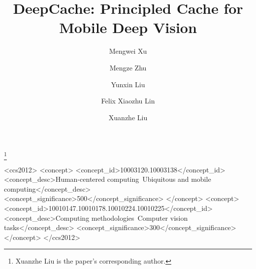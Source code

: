 \documentclass[10pt,acmtog]{acmart}
\newcommand{\framework}{DeepCache\xspace}
\begin{document}
\title{\framework: Principled Cache for Mobile Deep Vision}


 \author{Mengwei Xu}

  \author{Mengze Zhu}



 \author{Yunxin Liu}

 \author{Felix Xiaozhu Lin}
   
    \author{Xuanzhe Liu}\thanks{Xuanzhe Liu is the paper's corresponding author.}


%
%
\begin{CCSXML}
<ccs2012>
<concept>
<concept_id>10003120.10003138</concept_id>
<concept_desc>Human-centered computing~Ubiquitous and mobile computing</concept_desc>
<concept_significance>500</concept_significance>
</concept>
<concept>
<concept_id>10010147.10010178.10010224.10010225</concept_id>
<concept_desc>Computing methodologies~Computer vision tasks</concept_desc>
<concept_significance>300</concept_significance>
</concept>
</ccs2012>
\end{CCSXML}
\end{document}

